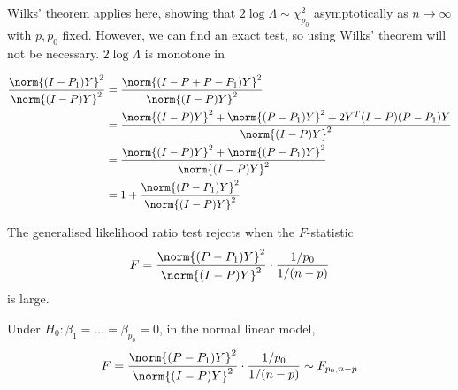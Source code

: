 Wilks' theorem applies here, showing that $2 \log \Lambda \sim \chi^2_{p_0}$ asymptotically as $n \to \infty$ with $p, p_0$ fixed.
However, we can find an exact test, so using Wilks' theorem will not be necessary.
$2 \log \Lambda$ is monotone in

\begin{align*}
	\frac{\norm{(I-P_1)Y}^2}{\norm{(I-P)Y}^2} & = \frac{\norm{(I-P+P-P_1)Y}^2}{\norm{(I-P)Y}^2} \\
	&= \frac{\norm{(I-P)Y}^2 + \norm{(P-P_1)Y}^2 + 2Y^\tran (I-P)(P-P_1) Y}{\norm{(I-P)Y}^2} \\
	&= \frac{\norm{(I-P)Y}^2 + \norm{(P-P_1)Y}^2}{\norm{(I-P)Y}^2} \\
	&= 1 + \frac{\norm{(P-P_1)Y}^2}{\norm{(I-P)Y}^2}
\end{align*}

The generalised likelihood ratio test rejects when the $F$-statistic
\begin{align*}
	F = \frac{\norm{(P-P_1)Y}^2}{\norm{(I-P)Y}^2} \cdot \frac{1/p_0}{1/(n-p)}
\end{align*}
is large.

\begin{theorem}
	Under $H_0\colon \beta_1 = \dots = \beta_{p_0} = 0$, in the normal linear model,
	\begin{align*}
		F = \frac{\norm{(P-P_1)Y}^2}{\norm{(I-P)Y}^2} \cdot \frac{1/p_0}{1/(n-p)} \sim F_{p_0,n-p}
	\end{align*}
\end{theorem}

